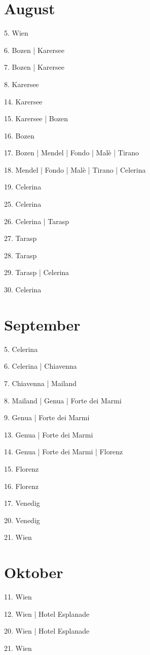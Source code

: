 \documentclass[twoside=false,titlepage=false,open=any, parskip=never, fontsize=10pt, headings=small, chapterprefix=false, appendixprefix=false, DIV=15]{scrbook}
\begin{document}
\begin{multicols}{3}
            \section*{August}
            5. Wien\par
            6. Bozen | Karersee\par
            7. Bozen | Karersee\par
            8. Karersee\par
            14. Karersee\par
            15. Karersee | Bozen\par
            16. Bozen\par
            17. Bozen | Mendel | Fondo | Malè | Tirano\par
            18. Mendel | Fondo | Malè | Tirano | Celerina\par
            19. Celerina\par
            25. Celerina\par
            26. Celerina | Tarasp\par
            27. Tarasp\par
            28. Tarasp\par
            29. Tarasp | Celerina\par
            30. Celerina\par
            \section*{September}
            5. Celerina\par
            6. Celerina | Chiavenna\par
            7. Chiavenna | Mailand\par
            8. Mailand | Genua | Forte dei Marmi\par
            9. Genua | Forte dei Marmi\par
            13. Genua | Forte dei Marmi\par
            14. Genua | Forte dei Marmi | Florenz\par
            15. Florenz\par
            16. Florenz\par
            17. Venedig\par
            20. Venedig\par
            21. Wien\par
            \section*{Oktober}
            11. Wien\par
            12. Wien | Hotel Esplanade\par
            20. Wien | Hotel Esplanade\par
            21. Wien\par

\end{multicols}
\end{document}
